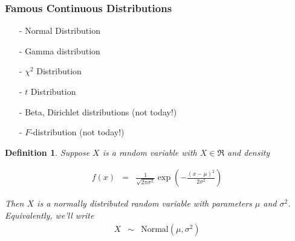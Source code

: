 \documentclass{beamer}
\newtheorem{defn}{Definition}
\numberwithin{equation}{section}
\begin{document}
\begin{frame}
\frametitle{Famous Continuous Distributions}

\begin{itemize}
\item[-] Normal Distribution
\item[-] Gamma distribution 
\item[-] $\chi^{2}$ Distribution
\item[-] $t$ Distribution
\item[-] Beta, Dirichlet distributions (not today!)
\item[-] $F$-distribution (not today!)
\end{itemize}



\end{frame}


\begin{frame}

\begin{defn}
Suppose $X$ is a random variable with $X \in \Re$ and \alert{density}

\begin{eqnarray}
f(x) & = & \frac{1}{\sqrt{2\pi \sigma^2}}\exp\left(-\frac{(x - \mu)^2}{2\sigma^2}\right) \nonumber 
\end{eqnarray}

Then $X$ is a \alert{normally} distributed random variable with parameters $\mu$ and $\sigma^2$.  \\


Equivalently, we'll write 
\begin{eqnarray}
X & \sim & \text{Normal}(\mu, \sigma^2) \nonumber 
\end{eqnarray}




\end{defn}
\end{frame}
\end{document}
